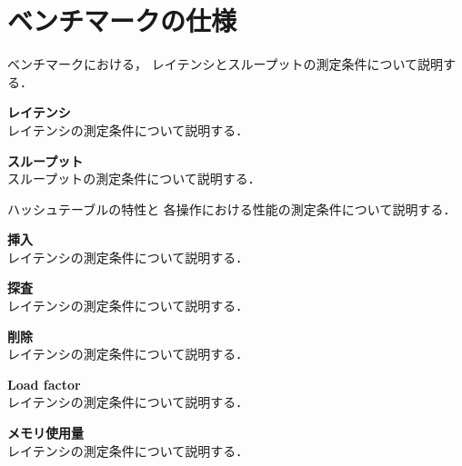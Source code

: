 \section{ベンチマークの仕様}

ベンチマークにおける，
レイテンシとスループットの測定条件について説明する．
\leavevmode \newline

{\bf レイテンシ}
\samepage \\ \indent
レイテンシの測定条件について説明する．
\leavevmode \newline

{\bf スループット}
\samepage \\ \indent
スループットの測定条件について説明する．
\leavevmode \newline

ハッシュテーブルの特性と
各操作における性能の測定条件について説明する．
\leavevmode \newline

{\bf 挿入}
\samepage \\ \indent
レイテンシの測定条件について説明する．
\leavevmode \newline

{\bf 探査}
\samepage \\ \indent
レイテンシの測定条件について説明する．
\leavevmode \newline

{\bf 削除}
\samepage \\ \indent
レイテンシの測定条件について説明する．
\leavevmode \newline

{\bf Load factor}
\samepage \\ \indent
レイテンシの測定条件について説明する．
\leavevmode \newline

{\bf メモリ使用量}
\samepage \\ \indent
レイテンシの測定条件について説明する．
\leavevmode \newline





%
%

















